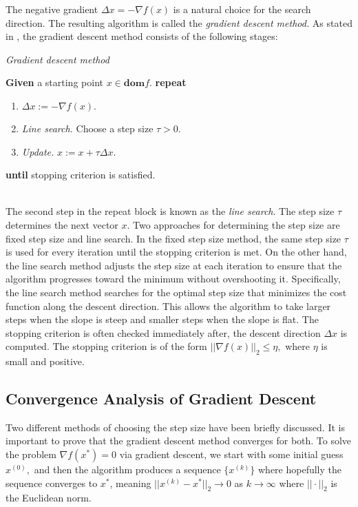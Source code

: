 The negative gradient $\Delta x = -\nabla f(x)$ is a natural choice for the search direction. The resulting algorithm is called the \textit{gradient descent method.} As stated in \cite[466]{boyd2004convex}, the gradient descent method consists of the following stages:
\begin{algorithm}
\caption{\textit{Gradient descent method}}\label{Pseudocode_GD}
\begin{algorithmic}
\State \textbf{Given} a starting point $x \in \textbf{dom} f$.
\vspace{0.03cm}
\State \textbf{repeat}\\
\begin{enumerate}
    \item $\Delta x := -\nabla f(x).$
    \item \textit{Line search.} Choose a step size $\tau > 0.$
    \item \textit{Update.} $x := x + \tau \Delta x.$
\end{enumerate}
\State \textbf{until} stopping criterion is satisfied.
\end{algorithmic}
\end{algorithm}\\
The second step in the repeat block is known as the \textit{line search}. The step size $\tau$ determines the next vector $x$. Two approaches for determining the step size are fixed step size and line search. In the fixed step size method, the same step size $\tau$ is used for every iteration until the stopping criterion is met. On the other hand, the line search method adjusts the step size at each iteration to ensure that the algorithm progresses toward the minimum without overshooting it. Specifically, the line search method searches for the optimal step size that minimizes the cost function along the descent direction. This allows the algorithm to take larger steps when the slope is steep and smaller steps when the slope is flat. The stopping criterion is often checked immediately after, the descent direction $\Delta x$ is computed. The stopping criterion is of the form $||\nabla f(x)||_{2} \leq \eta,$ where $\eta$ is small and positive. 

\subsection{Convergence Analysis of Gradient Descent}
Two different methods of choosing the step size have been briefly discussed. It is important to prove that the gradient descent method converges for both. To solve the problem $\nabla f(x^{*}) = 0$ via gradient descent, we start with some initial guess $x^{(0)},$ and then the algorithm produces a sequence $\{x^{(k)}\}$ where hopefully the sequence converges to $x^{*}$, meaning $||x^{(k)}-x^{*}||_{2} \rightarrow 0$ as $k \rightarrow \infty$ where $||\cdot||_{2}$ is the Euclidean norm.
